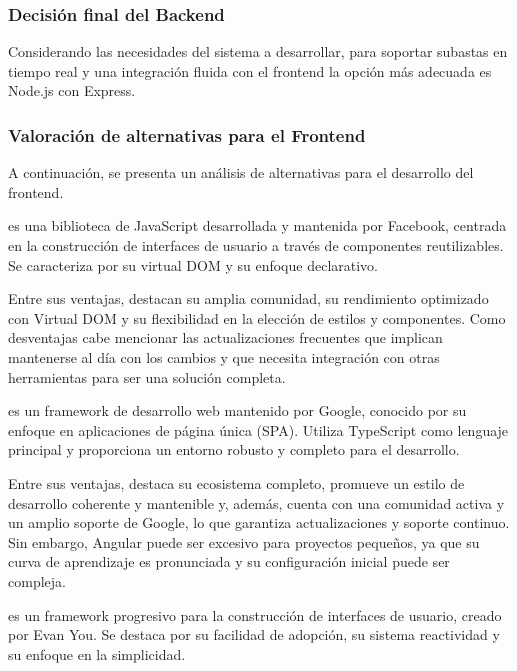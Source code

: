     
\subsubsection{Decisión final del Backend}
Considerando las necesidades del sistema a desarrollar, para soportar subastas en tiempo real y una integración fluida con el frontend la opción más adecuada es Node.js con Express.


\subsubsection{Valoración de alternativas para el Frontend}
A continuación, se presenta un análisis de alternativas para el desarrollo del frontend.

 es una biblioteca de JavaScript desarrollada y mantenida por Facebook, centrada en la construcción de interfaces de usuario a través de componentes reutilizables. Se caracteriza por su virtual DOM y su enfoque declarativo.

Entre sus ventajas, destacan su amplia comunidad, su rendimiento optimizado con Virtual DOM y su flexibilidad en la elección de estilos y componentes. 
Como desventajas cabe mencionar las actualizaciones frecuentes que implican mantenerse al día con los cambios y que necesita integración con otras herramientas para ser una solución completa.


 es un framework de desarrollo web mantenido por Google, conocido por su enfoque en aplicaciones de página única (SPA). Utiliza TypeScript como lenguaje principal y proporciona un entorno robusto y completo para el desarrollo.

Entre sus ventajas, destaca su ecosistema completo, promueve un estilo de desarrollo coherente y mantenible y, además, cuenta con una comunidad activa y un amplio soporte de Google, lo que garantiza actualizaciones y soporte continuo.
Sin embargo, Angular puede ser excesivo para proyectos pequeños, ya que su curva de aprendizaje es pronunciada y su configuración inicial puede ser compleja.

 es un framework progresivo para la construcción de interfaces de usuario, creado por Evan You. Se destaca por su facilidad de adopción, su sistema reactividad y su enfoque en la simplicidad.

